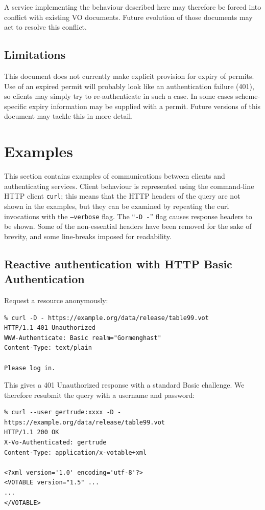\documentclass[11pt,a4paper]{ivoa}
\begin{document}
A service implementing the behaviour described here may therefore
be forced into conflict with existing VO documents.
Future evolution of those documents may act to resolve this conflict.

\subsection{Limitations}

This document does not currently make explicit provision for
expiry of permits.
Use of an expired permit will probably look like an authentication
failure (401), so clients may simply try to re-authenticate in
such a case.
In some cases scheme-specific expiry information may be supplied with a permit.
Future versions of this document may tackle this in more detail.


\section{Examples}

This section contains examples of communications between clients
and authenticating services.
Client behaviour is represented using the
command-line HTTP client {\tt curl};
this means that the HTTP headers of the query
are not shown in the examples,
but they can be examined by repeating the curl invocations
with the {\tt --verbose} flag.
The ``{\tt -D -}'' flag causes response headers to be shown.
Some of the non-essential headers have been removed for the sake
of brevity, and some line-breaks imposed for readability.

\subsection{Reactive authentication with HTTP Basic Authentication}


Request a resource anonymously:
{\footnotesize
\begin{verbatim}
% curl -D - https://example.org/data/release/table99.vot
HTTP/1.1 401 Unauthorized
WWW-Authenticate: Basic realm="Gormenghast"
Content-Type: text/plain

Please log in.
\end{verbatim}
}

\noindent
This gives a 401 Unauthorized response
with a standard Basic challenge.
We therefore resubmit the query with a username and password:
{\footnotesize
\begin{verbatim}
% curl --user gertrude:xxxx -D - https://example.org/data/release/table99.vot
HTTP/1.1 200 OK
X-Vo-Authenticated: gertrude
Content-Type: application/x-votable+xml

<?xml version='1.0' encoding='utf-8'?>
<VOTABLE version="1.5" ...
...
</VOTABLE>
\end{verbatim}
}
\end{document}
